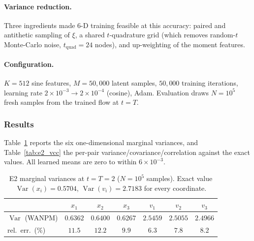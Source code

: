 \documentclass[11pt]{article}
\theoremstyle{plain}
\begin{document}
\paragraph{Variance reduction.}
Three ingredients made 6-D training feasible at this accuracy: paired and
antithetic sampling of $\xi$, a shared $t$-quadrature grid (which removes
random-$t$ Monte-Carlo noise, $t_{\mathrm{quad}}=24$ nodes), and up-weighting of
the moment features.

\paragraph{Configuration.}
$K=512$ sine features, $M=50{,}000$ latent samples, $50{,}000$ training
iterations, learning rate $2\times10^{-3}\to2\times10^{-4}$ (cosine), Adam. Evaluation draws $N=10^5$ fresh samples from the trained flow at $t=T$.

\subsubsection{Results}
\label{subsec:e2_results}

Table~\ref{tab:e2_marginals} reports the six one-dimensional marginal variances, and Table~\ref{tab:e2_vcc} the per-pair variance/covariance/correlation against the exact values. All learned means are zero to within $6\times10^{-3}$.

\begin{table}[H]
\centering
\caption{E2 marginal variances at $t=T=2$ ($N=10^5$ samples). Exact value
$\operatorname{Var}(x_i)=0.5704$, $\operatorname{Var}(v_i)=2.7183$ for every
coordinate.}
\label{tab:e2_marginals}
\small
\begin{tabular}{lcccccc}
\toprule
 & $x_1$ & $x_2$ & $x_3$ & $v_1$ & $v_2$ & $v_3$\\
\midrule
$\operatorname{Var}$ (WANPM) & $0.6362$ & $0.6400$ & $0.6267$ & $2.5459$ & $2.5055$ & $2.4966$\\
rel.\ err.\ (\%) & $11.5$ & $12.2$ & $9.9$ & $6.3$ & $7.8$ & $8.2$\\
\bottomrule
\end{tabular}
\end{table}
\end{document}
